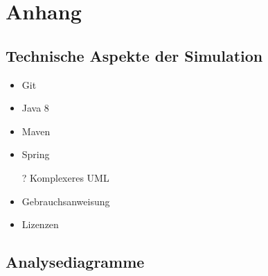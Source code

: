 \section*{Anhang}
\subsection*{Technische Aspekte der Simulation}
\begin{itemize}
	\item Git
	\item Java 8
	\item Maven
	\item Spring
	\item[?] Komplexeres UML
	\item Gebrauchsanweisung
	\item Lizenzen
\end{itemize}
\subsection*{Analysediagramme}
